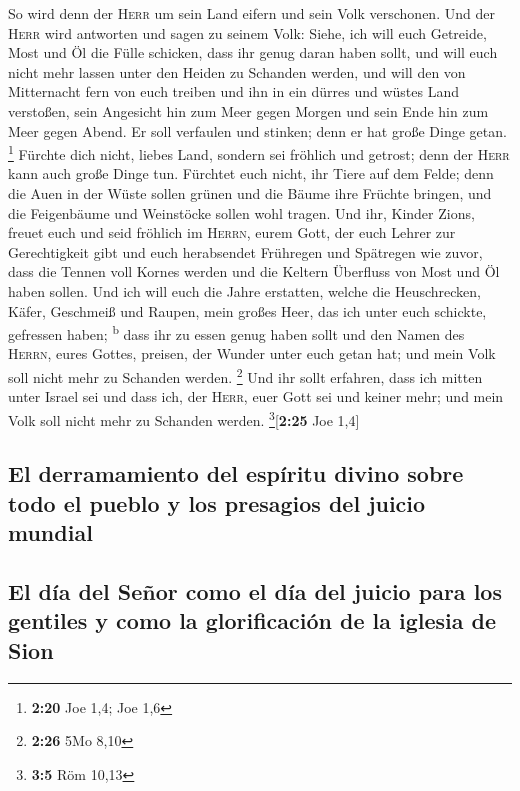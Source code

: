 So wird denn der \textsc{Herr} um sein Land eifern und
sein Volk verschonen.  Und der \textsc{Herr} wird
antworten und sagen zu seinem Volk: Siehe, ich will euch Getreide, Most
und Öl die Fülle schicken, dass ihr genug daran haben sollt, und will
euch nicht mehr lassen unter den Heiden zu Schanden werden,
 und will den von Mitternacht fern von euch treiben und
ihn in ein dürres und wüstes Land verstoßen, sein Angesicht hin zum Meer
gegen Morgen und sein Ende hin zum Meer gegen Abend. Er soll verfaulen
und stinken; denn er hat große Dinge getan. \footnote{\textbf{2:20} Joe
  1,4; Joe 1,6}  Fürchte dich nicht, liebes Land, sondern
sei fröhlich und getrost; denn der \textsc{Herr} kann auch große Dinge
tun.  Fürchtet euch nicht, ihr Tiere auf dem Felde; denn
die Auen in der Wüste sollen grünen und die Bäume ihre Früchte bringen,
und die Feigenbäume und Weinstöcke sollen wohl tragen. 
Und ihr, Kinder Zions, freuet euch und seid fröhlich im \textsc{Herrn},
eurem Gott, der euch Lehrer zur Gerechtigkeit gibt und euch herabsendet
Frühregen und Spätregen wie zuvor,  dass die Tennen voll
Kornes werden und die Keltern Überfluss von Most und Öl haben sollen.
 Und ich will euch die Jahre erstatten, welche die
Heuschrecken, Käfer, Geschmeiß und Raupen, mein großes Heer, das ich
unter euch schickte, gefressen haben; \textsuperscript{b}
 dass ihr zu essen genug haben sollt und den Namen des
\textsc{Herrn}, eures Gottes, preisen, der Wunder unter euch getan hat;
und mein Volk soll nicht mehr zu Schanden werden. \footnote{\textbf{2:26}
  5Mo 8,10}  Und ihr sollt erfahren, dass ich mitten
unter Israel sei und dass ich, der \textsc{Herr}, euer Gott sei und
keiner mehr; und mein Volk soll nicht mehr zu Schanden werden.
\footnote{\textbf{3:5} Röm 10,13}{[}\textbf{2:25} Joe 1,4{]}

\hypertarget{el-derramamiento-del-espuxedritu-divino-sobre-todo-el-pueblo-y-los-presagios-del-juicio-mundial}{%
\subsection{El derramamiento del espíritu divino sobre todo el pueblo y
los presagios del juicio
mundial}\label{el-derramamiento-del-espuxedritu-divino-sobre-todo-el-pueblo-y-los-presagios-del-juicio-mundial}}

\hypertarget{el-duxeda-del-seuxf1or-como-el-duxeda-del-juicio-para-los-gentiles-y-como-la-glorificaciuxf3n-de-la-iglesia-de-sion}{%
\subsection{El día del Señor como el día del juicio para los gentiles y
como la glorificación de la iglesia de
Sion}\label{el-duxeda-del-seuxf1or-como-el-duxeda-del-juicio-para-los-gentiles-y-como-la-glorificaciuxf3n-de-la-iglesia-de-sion}}

